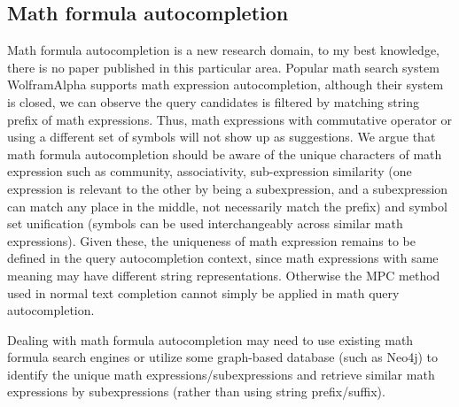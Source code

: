 \documentclass[12pt]{article} %
\begin{document}
\subsection{Math formula autocompletion}
Math formula autocompletion is a new research domain, to my best knowledge, there is no paper published in this particular area. 
Popular math search system WolframAlpha supports math expression autocompletion, although their system is closed, we can observe the query candidates is filtered by matching string prefix of math expressions. 
Thus, math expressions with commutative operator or using a different set of symbols will not show up as suggestions.
We argue that math formula autocompletion should be aware of the unique characters of math expression such as community, associativity, sub-expression similarity (one expression is relevant to the other by being a subexpression, and a subexpression can match any place in the middle, not necessarily match the prefix) and symbol set unification (symbols can be used interchangeably across similar math expressions).
Given these, the uniqueness of math expression remains to be defined in the query autocompletion context, since math expressions with same meaning may have different string representations. Otherwise the MPC method used in normal text completion cannot simply be applied in math query autocompletion.

Dealing with math formula autocompletion may need to use existing math formula search engines or utilize some graph-based database (such as Neo4j) to identify the unique math expressions/subexpressions and retrieve similar math expressions by subexpressions (rather than using string prefix/suffix).

{}

\end{document}
